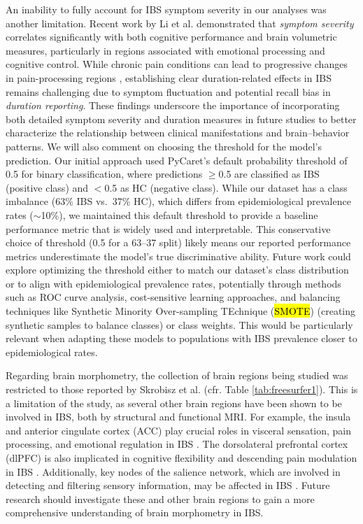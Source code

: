 \documentclass[diagnostics,article,accept,pdftex,moreauthors]{Definitions/mdpi}
\begin{document}
\indent An inability to fully account for IBS symptom severity in our analyses was another limitation. Recent work by Li et al. \cite{li2024irritable} demonstrated that \textit{symptom severity} correlates significantly with both cognitive performance and brain volumetric measures, particularly in regions associated with emotional processing and cognitive control. While chronic pain conditions can lead to progressive changes in pain-processing regions \cite{blankstein2010altered}, establishing clear duration-related effects in IBS remains challenging due to symptom fluctuation and potential recall bias in \textit{duration reporting}. These findings underscore the importance of incorporating both detailed symptom severity and duration measures in future studies to better characterize the relationship between clinical manifestations and brain--behavior patterns. {We will also comment on choosing the threshold for the model's prediction. Our initial approach used PyCaret's default probability threshold of 0.5 for binary classification, where predictions $\geq$0.5 are classified as IBS (positive class) and $<$0.5 as HC (negative class). While our dataset has a class imbalance (63\% IBS vs.\ 37\% HC), which differs from epidemiological prevalence rates ($\sim$10\%), we maintained this default threshold to provide a baseline performance metric that is widely used and interpretable. This conservative choice of threshold (0.5 for a 63--37 split) likely means our reported performance metrics underestimate the model's true discriminative ability. Future work could explore optimizing the threshold either to match our dataset's class distribution or to align with epidemiological prevalence rates, potentially through methods such as ROC curve analysis, cost-sensitive learning approaches, and balancing techniques like Synthetic Minority Over-sampling TEchnique (\hl{SMOTE}) %
(creating synthetic samples to balance classes) or class weights. This would be particularly relevant when adapting these models to populations with IBS prevalence closer to epidemiological rates.}

\indent Regarding brain morphometry, the collection of brain regions being studied was restricted to those reported by Skrobisz et al. \cite{Skrobisz2022} (cfr. Table \ref{tab:freesurfer1}). This is a limitation of the study, as several other brain regions have been shown to be involved in IBS, both by structural and functional MRI. For example, the insula and anterior cingulate cortex (ACC) play crucial roles in visceral sensation, pain processing, and emotional regulation in IBS \cite{tillisch2011quantitative}. The dorsolateral prefrontal cortex (dlPFC) is also implicated in cognitive flexibility and descending pain modulation in IBS \cite{grinsvall2021altered}. Additionally, key nodes of the salience network, which are involved in detecting and filtering sensory information, may be affected in IBS \cite{liu2016excessive}. Future research should investigate these and other brain regions to gain a more comprehensive understanding of brain morphometry in IBS.
\end{document}
